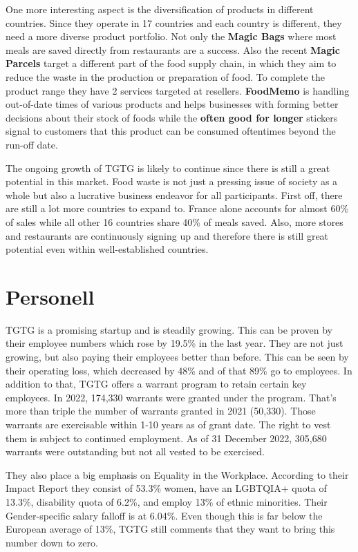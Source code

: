 \documentclass{article}
\begin{document}
One more interesting aspect is the diversification of products in different
countries. Since they operate in 17 countries \cite{impact} and each country is
different, they need a more diverse product portfolio. Not only the
\textbf{Magic Bags} where most meals are saved directly from restaurants are a
success. Also the recent \textbf{Magic Parcels} target a different part of the
food supply chain, in which they aim to reduce the waste in the production or
preparation of food. To complete the product range they have 2 services
targeted at resellers. \textbf{FoodMemo} is handling out-of-date times of
various products and helps businesses with forming better decisions about their
stock of foods while the \textbf{often good for longer} stickers signal to
customers that this product can be consumed oftentimes beyond the run-off date.
\cite{impact}

The ongoing growth of TGTG is likely to continue since there is still a great
potential in this market. Food waste is not just a pressing issue of society as
a whole but also a lucrative business endeavor for all participants. First off,
there are still a lot more countries to expand to. France alone accounts for
almost 60\% of sales while all other 16 countries share 40\% of meals saved.
Also, more stores and restaurants are continuously signing up and therefore
there is still great potential even within well-established countries.

\section{Personell}

TGTG is a promising startup and is steadily growing. This can be proven by
their employee numbers which rose by 19.5\% in the last year. They are not just
growing, but also paying their employees better than before. This can be seen
by their operating loss, which decreased by 48\% and of that 89\% go to
employees. In addition to that, TGTG offers a warrant program to retain certain
key employees. In 2022, 174,330 warrants were granted under the program. That's
more than triple the number of warrants granted in 2021 (50,330). Those
warrants are exercisable within 1-10 years as of grant date. The right to vest
them is subject to continued employment. As of 31 December 2022, 305,680
warrants were outstanding but not all vested to be exercised. \cite{impact}

They also place a big emphasis on Equality in the Workplace. According to their
Impact Report they consist of 53.3\% women, have an LGBTQIA+ quota of 13.3\%,
disability quota of 6.2\%, and employ 13\% of ethnic minorities. Their
Gender-specific salary falloff is at 6.04\%. Even though this is far below the
European average of 13\%, TGTG still comments that they want to bring this
number down to zero. \cite{impact}
\end{document}
